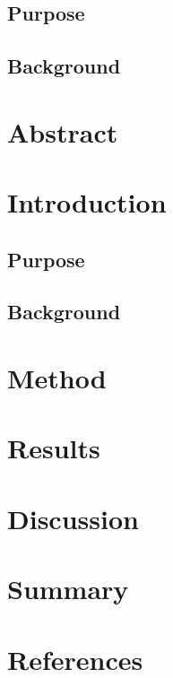 \documentclass{article}
\begin{document}
\subsection{Purpose}

\subsection{Background}



\tableofcontents
\large

\thispagestyle{empty} 


\newpage 

\section*{Abstract}
\newpage




\section{Introduction}
\vspace{1cm}


\subsection{Purpose}
\subsection{Background}
\section{Method}

\vspace{2cm}


\section{Results}
\newpage


\section{Discussion}

\vspace{0.6cm}



\section{Summary}


\newpage


\section{References}
\vspace{0.4cm}
\printbibliography[heading=none] %
\end{document}
